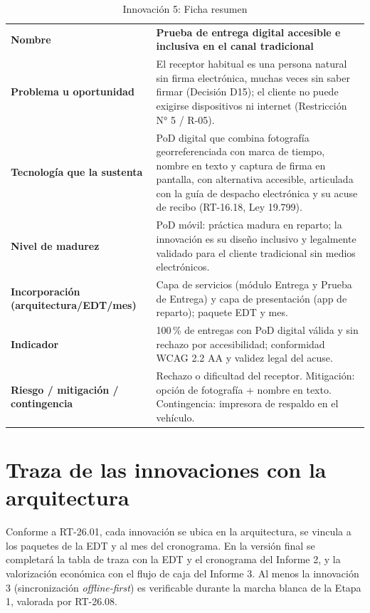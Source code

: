 \begin{table}[htbp]
\centering
\small
\caption{Innovación 5: Ficha resumen}
\label{tab:inn5}
\begin{tabularx}{\textwidth}{@{}L{5.2cm}X@{}}
\toprule
\textbf{Nombre} &
\textbf{Prueba de entrega digital accesible e inclusiva en el canal tradicional} \\
\addlinespace
\textbf{Problema u oportunidad} &
El receptor habitual es una persona natural sin firma electrónica, muchas veces sin saber
firmar (Decisión D15); el cliente no puede exigirse dispositivos ni internet (Restricción
N° 5 / R-05). \\
\addlinespace
\textbf{Tecnología que la sustenta} &
PoD digital que combina fotografía georreferenciada con marca de tiempo, nombre en texto
y captura de firma en pantalla, con alternativa accesible, articulada con la guía de
despacho electrónica y su acuse de recibo (RT-16.18, Ley 19.799). \\
\addlinespace
\textbf{Nivel de madurez} &
PoD móvil: práctica madura en reparto; la innovación es su diseño inclusivo y legalmente
validado para el cliente tradicional sin medios electrónicos. \\
\addlinespace
\textbf{Incorporación (arquitectura/EDT/mes)} &
Capa de servicios (módulo Entrega y Prueba de Entrega) y capa de presentación (app de
reparto); \pendiente{} paquete EDT y mes. \\
\addlinespace
\textbf{Indicador} &
100\,\% de entregas con PoD digital válida y sin rechazo por accesibilidad; conformidad
WCAG 2.2 AA y validez legal del acuse. \\
\addlinespace
\textbf{Riesgo / mitigación / contingencia} &
Rechazo o dificultad del receptor. Mitigación: opción de fotografía + nombre en texto.
Contingencia: impresora de respaldo en el vehículo. \\
\bottomrule
\end{tabularx}
\end{table}

\section{Traza de las innovaciones con la arquitectura}

Conforme a RT-26.01, cada innovación se ubica en la arquitectura, se vincula a los
paquetes de la EDT y al mes del cronograma. En la versión final se completará la tabla de
traza con la EDT y el cronograma del Informe 2, y la valorización económica con el flujo
de caja del Informe 3. Al menos la innovación 3 (sincronización \emph{offline-first}) es
verificable durante la marcha blanca de la Etapa 1, valorada por RT-26.08.
